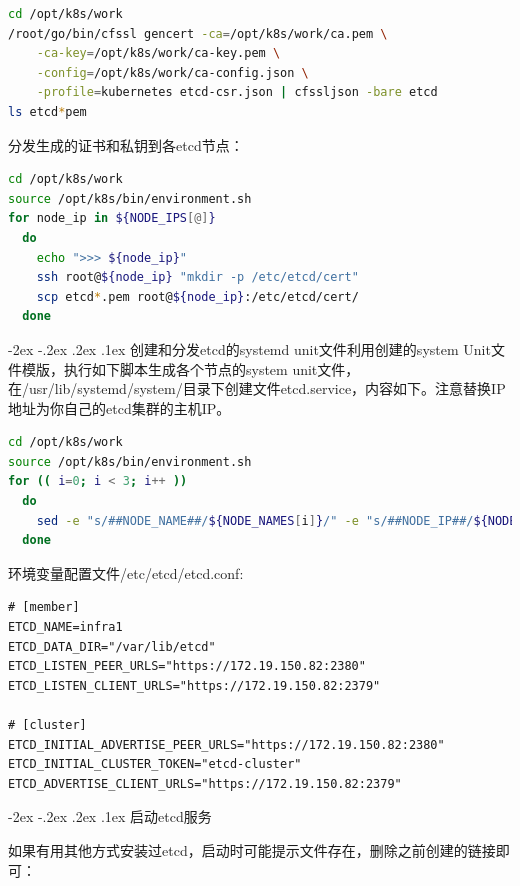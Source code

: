 \documentclass[8pt]{book}
\makeatletter
\numberwithin{dummy}{section}
\theoremstyle{ocrenumbox}
\theoremstyle{blacknumex}
\theoremstyle{blacknumbox}
\theoremstyle{ocrenum}
\renewcommand\paragraph{\@startsection{paragraph}{4}{\z@}
	{-2ex \@plus-.2ex \@minus .2ex}
	{.1ex}
	{\normalfont\small\sffamily\bfseries}}
\makeatother
\begin{document}
\begin{lstlisting}[language=Bash]
cd /opt/k8s/work
/root/go/bin/cfssl gencert -ca=/opt/k8s/work/ca.pem \
    -ca-key=/opt/k8s/work/ca-key.pem \
    -config=/opt/k8s/work/ca-config.json \
    -profile=kubernetes etcd-csr.json | cfssljson -bare etcd
ls etcd*pem
\end{lstlisting}


分发生成的证书和私钥到各etcd节点：

\begin{lstlisting}[language=Bash]
cd /opt/k8s/work
source /opt/k8s/bin/environment.sh
for node_ip in ${NODE_IPS[@]}
  do
    echo ">>> ${node_ip}"
    ssh root@${node_ip} "mkdir -p /etc/etcd/cert"
    scp etcd*.pem root@${node_ip}:/etc/etcd/cert/
  done
\end{lstlisting}



\paragraph{创建和分发etcd的systemd unit文件}利用创建的system Unit文件模版，执行如下脚本生成各个节点的system unit文件，在/usr/lib/systemd/system/目录下创建文件etcd.service，内容如下。注意替换IP地址为你自己的etcd集群的主机IP。

\begin{lstlisting}[language=Bash]
cd /opt/k8s/work
source /opt/k8s/bin/environment.sh
for (( i=0; i < 3; i++ ))
  do
    sed -e "s/##NODE_NAME##/${NODE_NAMES[i]}/" -e "s/##NODE_IP##/${NODE_IPS[i]}/" etcd.service.template > etcd-${NODE_IPS[i]}.service 
  done
\end{lstlisting}

环境变量配置文件/etc/etcd/etcd.conf:

\begin{lstlisting}
# [member]
ETCD_NAME=infra1
ETCD_DATA_DIR="/var/lib/etcd"
ETCD_LISTEN_PEER_URLS="https://172.19.150.82:2380"
ETCD_LISTEN_CLIENT_URLS="https://172.19.150.82:2379"

# [cluster]
ETCD_INITIAL_ADVERTISE_PEER_URLS="https://172.19.150.82:2380"
ETCD_INITIAL_CLUSTER_TOKEN="etcd-cluster"
ETCD_ADVERTISE_CLIENT_URLS="https://172.19.150.82:2379"
\end{lstlisting}

\paragraph{启动etcd服务}


如果有用其他方式安装过etcd，启动时可能提示文件存在，删除之前创建的链接即可：
\end{document}
